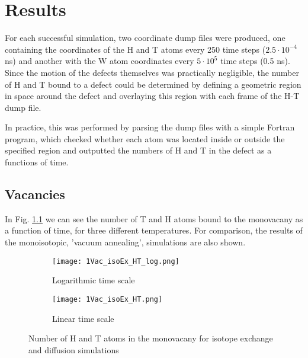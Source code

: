 \chapter{Results}

For each successful simulation, two coordinate dump files were produced, one containing the coordinates of the H and T atoms every 250 time steps ($2.5\cdot 10^{-4}$ ns) and another with the W atom coordinates every $5\cdot 10^5$ time steps (0.5 ns).
Since the motion of the defects themselves was practically negligible, the number of H and T bound to a defect could be determined by defining a geometric region in space around the defect and overlaying this region with each frame of the H-T dump file.

In practice, this was performed by parsing the dump files with a simple Fortran program, which checked whether each atom was located inside or outside the specified region and outputted the numbers of H and T in the defect as a functions of time.

\section{Vacancies}
In Fig. \ref{Fig:1Vac_results} we can see the number of T and H atoms bound to the monovacany as a function of time, for three different temperatures. 
For comparison, the results of the monoisotopic, 'vacuum annealing', simulations are also shown. 

\begin{figure}[ht]
\begin{subfigure}{.5\textwidth}
  \centering
  \texttt{[image: 1Vac\_isoEx\_HT\_log.png]}  
  \caption{Logarithmic time scale}
\end{subfigure}
\begin{subfigure}{.5\textwidth}
  \centering
  \texttt{[image: 1Vac\_isoEx\_HT.png]}  
  \caption{Linear time scale}
\end{subfigure}
\caption{Number of H and T atoms in the monovacany for isotope exchange and diffusion simulations}
 \label{Fig:1Vac_results} 
\end{figure}


